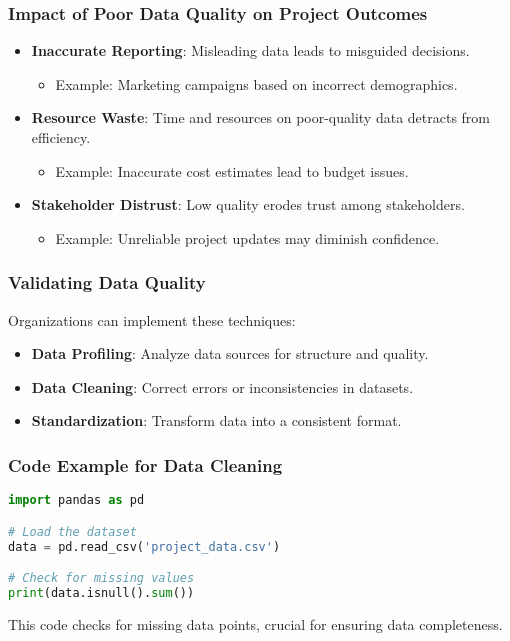 \documentclass[aspectratio=169]{beamer}
\begin{document}
\begin{frame}
    \frametitle{Impact of Poor Data Quality on Project Outcomes}
    \begin{itemize}
        \item \textbf{Inaccurate Reporting}: Misleading data leads to misguided decisions.
            \begin{itemize}
                \item Example: Marketing campaigns based on incorrect demographics.
            \end{itemize}
        \item \textbf{Resource Waste}: Time and resources on poor-quality data detracts from efficiency.
            \begin{itemize}
                \item Example: Inaccurate cost estimates lead to budget issues.
            \end{itemize}
        \item \textbf{Stakeholder Distrust}: Low quality erodes trust among stakeholders.
            \begin{itemize}
                \item Example: Unreliable project updates may diminish confidence.
            \end{itemize}
    \end{itemize}
\end{frame}

\begin{frame}
    \frametitle{Validating Data Quality}
    Organizations can implement these techniques:
    \begin{itemize}
        \item \textbf{Data Profiling}: Analyze data sources for structure and quality.
        \item \textbf{Data Cleaning}: Correct errors or inconsistencies in datasets.
        \item \textbf{Standardization}: Transform data into a consistent format.
    \end{itemize}
\end{frame}

\begin{frame}[fragile]
    \frametitle{Code Example for Data Cleaning}
    \begin{lstlisting}[language=Python]
import pandas as pd

# Load the dataset
data = pd.read_csv('project_data.csv')

# Check for missing values
print(data.isnull().sum())
    \end{lstlisting}
    This code checks for missing data points, crucial for ensuring data completeness.
\end{frame}
\end{document}
